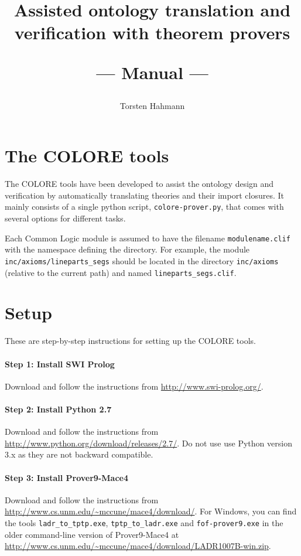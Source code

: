 \documentclass{article}
\title{Assisted ontology translation and verification with theorem provers\\
\begin{Large}
--- Manual ---
\end{Large}
}
\author{Torsten Hahmann}
\begin{document}
\maketitle

\section{The COLORE tools}

The COLORE tools have been developed to assist the ontology design and verification by automatically translating theories and their import closures. It mainly consists of a single python script, \texttt{colore-prover.py}, that comes with several options for different tasks.

Each Common Logic module is assumed to have the filename \texttt{modulename.clif} with the namespace defining the directory.
For example, the module \texttt{inc/axioms/\allowbreak lineparts\_segs} should be located in the directory \texttt{inc/axioms} (relative to the current path) and named \texttt{lineparts\_segs.clif}.

\section{Setup}

These are step-by-step instructions for setting up the COLORE tools.

\paragraph{Step 1: Install SWI Prolog}
Download and follow the instructions from \url{http://www.swi-prolog.org/}.

\paragraph{Step 2: Install Python 2.7}
Download and follow the instructions from \url{http://www.python.org/download/releases/2.7/}.
Do not use use Python version 3.x as they are not backward compatible.

\paragraph{Step 3: Install Prover9-Mace4}

Download and follow the instructions from \url{http://www.cs.unm.edu/~mccune/mace4/download/}.
For Windows, you can find the tools \texttt{ladr\_to\_tptp.exe}, \texttt{tptp\_to\_ladr.exe} and \texttt{fof-prover9.exe} in the older command-line version of Prover9-Mace4 at \url{http://www.cs.unm.edu/~mccune/mace4/download/LADR1007B-win.zip}.
\end{document}
